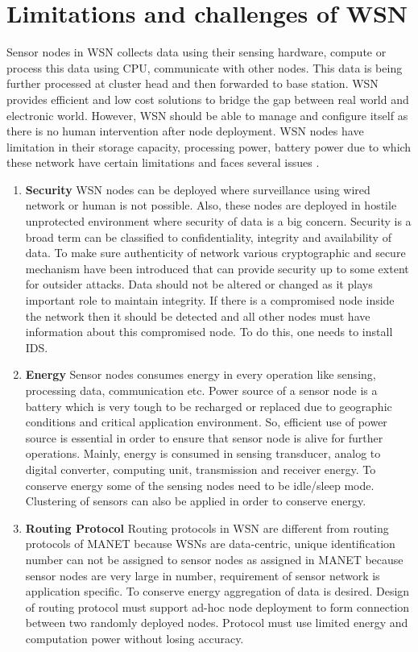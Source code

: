 \section{Limitations and challenges of WSN} \label{WSNChallenges}
Sensor nodes in WSN collects data using their sensing hardware, compute or process this data using CPU, communicate with other nodes. This data is being further processed at cluster head and then forwarded to base station. WSN provides efficient and low cost solutions to bridge the gap between real world and electronic world. However, WSN should be able to manage and configure itself as there is no human intervention after node deployment. WSN nodes have limitation in their storage capacity, processing power, battery power due to which these network have certain limitations and faces several issues \cite{sharma2013issues}.
\begin{enumerate}[label=\textbf{\roman*}]
    \item \textbf{Security }
    WSN nodes can be deployed where surveillance using wired network or human is not possible. Also, these nodes are deployed in hostile unprotected environment where security of data is a big concern. Security is a broad term can be classified to confidentiality, integrity and availability of data. To make sure authenticity of network various cryptographic and secure mechanism have been introduced that can provide security up to some extent for outsider attacks. Data should not be altered or changed as it plays important role to maintain integrity. If there is a compromised node inside the network then it should be detected and all other nodes must have information about this compromised node. To do this, one needs to install IDS.
    \item \textbf{Energy }
    Sensor nodes consumes energy in every operation like sensing, processing data, communication etc. Power source of a sensor node is a battery which is very tough to be recharged or replaced due to geographic conditions and critical application environment. So, efficient use of power source is essential in order to ensure that sensor node is alive for further operations. Mainly, energy is consumed in sensing transducer, analog to digital converter, computing unit, transmission and receiver energy. To conserve energy some of the sensing nodes need to be idle/sleep mode. Clustering of sensors can also be applied in order to conserve energy.
    \item \textbf{Routing Protocol }
    Routing protocols in WSN are different from routing protocols of MANET because WSNs are data-centric, unique identification number can not be assigned to sensor nodes as assigned in MANET because sensor nodes are very large in number, requirement of sensor network is application specific. To conserve energy aggregation of data is desired. Design of routing protocol must support ad-hoc node deployment to form connection between two randomly deployed nodes. Protocol must use limited energy and computation power without losing accuracy.

\end{enumerate}

